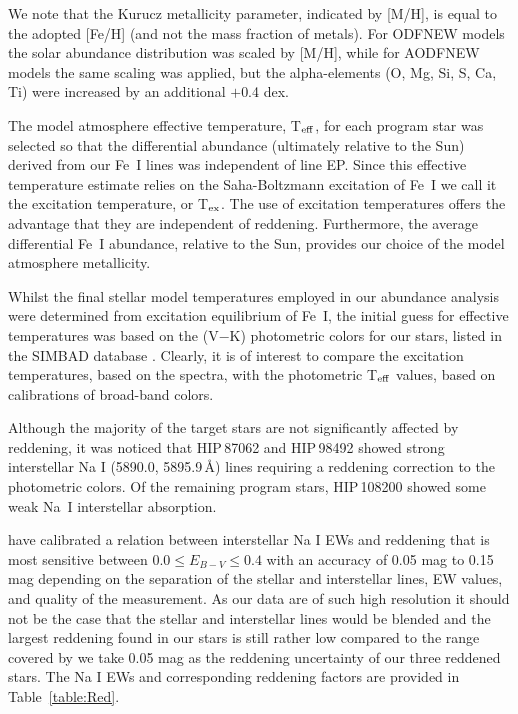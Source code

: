 \documentclass[revtex4]{emulateapj}
\begin{document}
We note that the Kurucz metallicity parameter, indicated by [M/H], is equal to the adopted [Fe/H] (and not the mass fraction of metals).  For ODFNEW models the solar abundance distribution was scaled by [M/H], while for AODFNEW models the same scaling was applied, but the alpha-elements (O, Mg, Si, S, Ca, Ti) were increased by an additional $+$0.4 dex.

The model atmosphere effective temperature, T$_{\rm eff}$, for each program star was selected so that the differential abundance (ultimately relative to the Sun) derived from our Fe~I lines was independent of line EP.  Since this effective temperature estimate relies on the Saha-Boltzmann excitation of Fe~I we call it the excitation temperature, or T$_{\rm ex}$.  The use of excitation temperatures offers the advantage that they are independent of reddening.  Furthermore, the average differential Fe~I abundance, relative to the Sun, provides our choice of the model atmosphere metallicity. 

Whilst the final stellar model temperatures employed in our abundance analysis  were determined from excitation equilibrium of Fe~I, the initial guess for effective temperatures was based on the (V$-$K) photometric colors for our stars, listed in the SIMBAD database \citep{Deemin1961,Hog2000,Merm1986,Sandage1964}.  Clearly, it is of interest to compare the excitation temperatures, based on the spectra, with the photometric T$_{\rm eff}$ values, based on calibrations of broad-band colors.

Although the majority of the target stars are not significantly affected by reddening, it was noticed that HIP\,87062 and HIP\,98492 showed strong interstellar Na I (5890.0, 5895.9\,\AA) lines requiring a reddening correction to the photometric colors.  Of the remaining program stars, HIP\,108200 showed some weak Na~I interstellar absorption.  

\citet{MunZwit1997} have calibrated a relation between interstellar Na I EWs and reddening that is most sensitive between $0.0\leq E_{B-V}\leq0.4$ with an accuracy of 0.05 mag to 0.15 mag depending on the separation of the stellar and interstellar lines, EW values, and quality of the measurement.  As our data are of such high resolution it should not be the case that the stellar and interstellar lines would be blended and the largest reddening found in our stars is still rather low compared to the range covered by \citet{MunZwit1997} we take 0.05 mag as the reddening uncertainty of our three reddened stars.  The Na I EWs and corresponding reddening factors are provided in Table~\ref{table:Red}.
\end{document}
